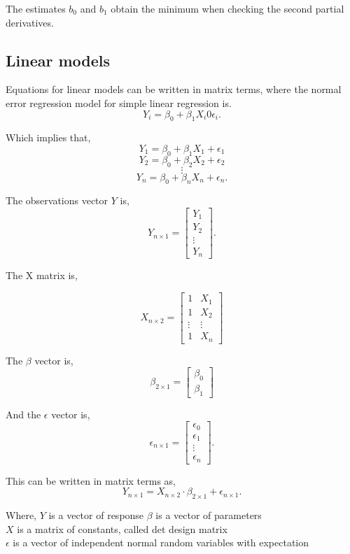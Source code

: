 \noindent The estimates $b_0$ and $b_1$ obtain the minimum when checking the second partial derivatives. \newline


\subsection{Linear models}

Equations for linear models can be written in matrix terms, where the normal error regression model for simple linear regression is.
$$Y_i = \beta_0 + \beta_1 X_i 0 \epsilon_i .$$ 


\noindent Which implies that,
$$Y_1 = \beta_0 + \beta_1 X_1 + \epsilon_1$$
$$Y_2 = \beta_0 + \beta_2 X_2 + \epsilon_2$$
$$\vdots$$
$$Y_n = \beta_0 + \beta_n X_n + \epsilon_n .$$

\noindent The observations vector $Y$ is,
$$ Y_{n \times 1} =
\left[
\begin{array}{c}
	Y_1 \\ 
	Y_2 \\ 
	\vdots \\
	Y_n 
\end{array}
\right].
$$	

\noindent The X matrix is, 

$$X_{n \times 2}=
\left[
\begin{array}{cc}
	1 & X_1 \\ 
	1 & X_2 \\ 
	\vdots & \vdots \\
	1 & X_n
\end{array}
\right]
$$


\noindent The $\beta$ vector is, 
$$ \beta_{2 \times 1} =
\left[
\begin{array}{c}
	\beta_0 \\ 
	\beta_1 
\end{array}
\right]
$$

\noindent And the $\epsilon$ vector is,
$$ \epsilon_{n \times 1} =
\left[
\begin{array}{c}
	\epsilon_0 \\ 
	\epsilon_1 \\
	\vdots \\
	\epsilon_n 
\end{array}
\right].
$$

\noindent This can be written in matrix terms as, 
$$Y_{n \times 1}=X_{n \times 2} \cdot \beta_{2 \times 1} + \epsilon_{n \times 1} .$$	

\noindent Where, \newline
\textbf{$Y$} is a vector of response \newline
\textbf{$\beta$} is a vector of parameters \\
\textbf{$X$} is a matrix of constants, called det design matrix\\
\textbf{$\epsilon$} is a vector of independent normal random variables with expectation\\


